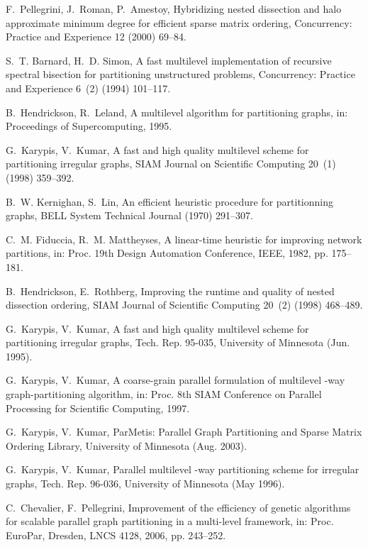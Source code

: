 \documentclass[fleqn,12pt,twoside]{article}
\begin{document}
\begin{thebibliography}{10}
F.~Pellegrini, J.~Roman, P.~Amestoy, Hybridizing nested dissection and halo
  approximate minimum degree for efficient sparse matrix ordering,
  {C}oncurrency: {P}ractice and {E}xperience 12 (2000) 69--84.

S.~T. Barnard, H.~D. Simon, A fast multilevel implementation of recursive
  spectral bisection for partitioning unstructured problems, {C}oncurrency:
  {P}ractice and {E}xperience 6~(2) (1994) 101--117.

B.~Hendrickson, R.~Leland, A multilevel algorithm for partitioning graphs, in:
  Proceedings of Supercomputing, 1995.

G.~Karypis, V.~Kumar, A fast and high quality multilevel scheme for
  partitioning irregular graphs, {SIAM} {J}ournal on {S}cientific {C}omputing
  20~(1) (1998) 359--392.

B.~W. Kernighan, S.~Lin, An efficient heuristic procedure for partitionning
  graphs, {BELL} System Technical Journal (1970) 291--307.

C.~M. Fiduccia, R.~M. Mattheyses, A linear-time heuristic for improving network
  partitions, in: Proc\@. 19th {D}esign {A}utomation {C}onference, {IEEE},
  1982, pp. 175--181.

B.~Hendrickson, E.~Rothberg, Improving the runtime and quality of nested
  dissection ordering, {SIAM} {J}ournal of {S}cientific {C}omputing 20~(2)
  (1998) 468--489.

G.~Karypis, V.~Kumar, A fast and high quality multilevel scheme for
  partitioning irregular graphs, Tech. Rep. 95-035, {U}niversity of {M}innesota
  (Jun. 1995).

G.~Karypis, V.~Kumar, A coarse-grain parallel formulation of multilevel
  {}-way graph-partitioning algorithm, in: Proc. 8th {SIAM} Conference on
  Parallel Processing for Scientific Computing, 1997.

G.~Karypis, V.~Kumar, {\sc ParMetis}: Parallel Graph Partitioning and Sparse
  Matrix Ordering Library, University of Minnesota (Aug. 2003).

G.~Karypis, V.~Kumar, Parallel multilevel -way partitioning scheme for
  irregular graphs, Tech. Rep. 96-036, University of Minnesota (May 1996).

C.~Chevalier, F.~Pellegrini, Improvement of the efficiency of genetic
  algorithms for scalable parallel graph partitioning in a multi-level
  framework, in: Proc\@. EuroPar, Dresden, LNCS 4128, 2006, pp. 243--252.


\end{thebibliography}
\end{document}
